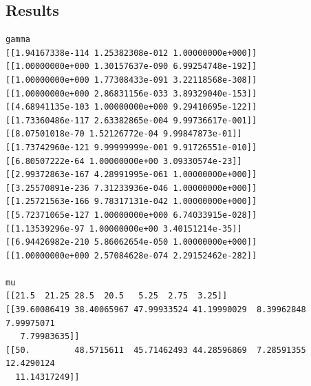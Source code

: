 \documentclass[a4paper, 11pt]{article}
\numberwithin{equation}{subsection}
\begin{document}
\subsection{Results}
\begin{lstlisting}[language={}]
gamma
[[1.94167338e-114 1.25382308e-012 1.00000000e+000]]
[[1.00000000e+000 1.30157637e-090 6.99254748e-192]]
[[1.00000000e+000 1.77308433e-091 3.22118568e-308]]
[[1.00000000e+000 2.86831156e-033 3.89329040e-153]]
[[4.68941135e-103 1.00000000e+000 9.29410695e-122]]
[[1.73360486e-117 2.63382865e-004 9.99736617e-001]]
[[8.07501018e-70 1.52126772e-04 9.99847873e-01]]
[[1.73742960e-121 9.99999999e-001 9.91726551e-010]]
[[6.80507222e-64 1.00000000e+00 3.09330574e-23]]
[[2.99372863e-167 4.28991995e-061 1.00000000e+000]]
[[3.25570891e-236 7.31233936e-046 1.00000000e+000]]
[[1.25721563e-166 9.78317131e-042 1.00000000e+000]]
[[5.72371065e-127 1.00000000e+000 6.74033915e-028]]
[[1.13539296e-97 1.00000000e+00 3.40151214e-35]]
[[6.94426982e-210 5.86062654e-050 1.00000000e+000]]
[[1.00000000e+000 2.57084628e-074 2.29152462e-282]]

mu
[[21.5  21.25 28.5  20.5   5.25  2.75  3.25]]
[[39.60086419 38.40065967 47.99933524 41.19990029  8.39962848  7.99975071
   7.79983635]]
[[50.         48.5715611  45.71462493 44.28596869  7.28591355 12.4290124 
  11.14317249]]


\end{lstlisting}
\end{document}
